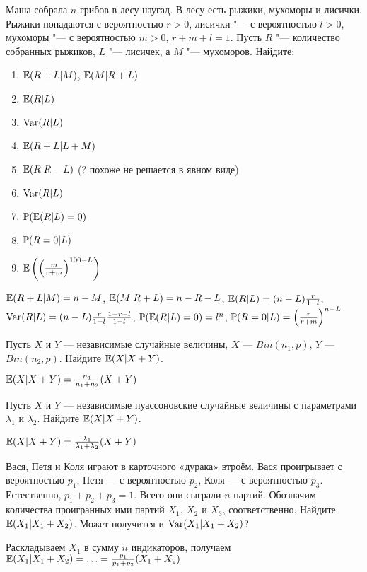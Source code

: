 \begin{problem}
Маша собрала $n$ грибов в лесу наугад. В лесу есть рыжики, мухоморы и лисички. Рыжики попадаются с вероятностью $r>0$, лисички "--- с вероятностью $l>0$,  мухоморы "--- с вероятностью $m>0$, $r+m+l=1$. Пусть $R$ "--- количество собранных рыжиков, $L$ "--- лисичек, а $M$ "--- мухоморов. Найдите:
\begin{enumerate}
\item $\E(R+L|M)$, $\E(M|R+L)$
\item $\E(R|L)$
\item $\Var(R|L)$
\item $\E(R+L|L+M)$
\item $\E(R|R-L)$ (? похоже не решается в явном виде)
\item $\Var(R|L)$
\item $\P(\E(R|L)=0)$
\item $\P(R=0 | L)$
\item $\E \left( \left( \frac{m}{r+m} \right)^{100-L} \right)$
\end{enumerate}

\begin{sol}
$\E(R+L|M)=n-M$, $\E(M|R+L)=n-R-L$, $\E(R|L)=(n-L)\frac{r}{1-l}$, $\Var(R|L)=(n-L)\frac{r}{1-l}\frac{1-r-l}{1-l}$, $\P(\E(R|L)=0)=l^{n}$, $\P(R=0 | L)=\left(\frac{r}{r+m}\right)^{n-L}$
\end{sol}
\end{problem}

\begin{problem}
 Пусть $X$ и $Y$ — независимые случайные величины, $X$ — $Bin(n_{1},p)$, $Y$ — $Bin(n_{2},p)$. Найдите $\E(X|X+Y)$.

\begin{sol}
$\E(X|X+Y)=\frac{n_{1}}{n_{1}+n_{2}}(X+Y)$
\end{sol}
\end{problem}

\begin{problem}
 Пусть $X$ и $Y$ — независимые пуассоновские случайные величины с параметрами $\lambda_{1}$ и $\lambda_{2}$. Найдите $\E(X|X+Y)$.

\begin{sol}
$\E(X|X+Y)=\frac{\lambda_{1}}{\lambda_{1}+\lambda_{2}}(X+Y)$
\end{sol}
\end{problem}

\begin{problem}
Вася, Петя и Коля играют в карточного «дурака» втроём. Вася проигрывает с вероятностью $p_1$, Петя — с вероятностью $p_2$, Коля — с вероятностью $p_3$. Естественно, $p_1+p_2+p_3=1$. Всего они сыграли $n$ партий. Обозначим количества проигранных ими партий $X_1$, $X_2$ и $X_3$, соответственно. Найдите $\E(X_1|X_1+X_2)$. Может получится и $\Var(X_1|X_1+X_2)$?

\begin{sol}
Раскладываем $X_1$ в сумму $n$ индикаторов, получаем $\E(X_1|X_1+X_2)=\ldots=\frac{p_1}{p_1+p_2}(X_1+X_2)$
\end{sol}
\end{problem}


